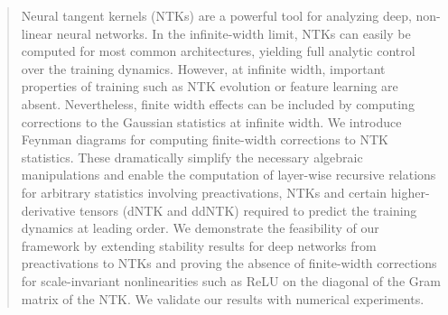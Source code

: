 \begin{abstract}
  Neural tangent kernels (NTKs) are a powerful tool for analyzing deep, non-linear neural networks. In the infinite-width limit, NTKs can easily be computed for most common architectures, yielding full analytic control over the training dynamics. However, at infinite width, important properties of training such as NTK evolution or feature learning are absent. Nevertheless, finite width effects can be included by computing corrections to the Gaussian statistics at infinite width. We introduce Feynman diagrams for computing finite-width corrections to NTK statistics. These dramatically simplify the necessary algebraic manipulations and enable the computation of layer-wise recursive relations for arbitrary statistics involving preactivations, NTKs and certain higher-derivative tensors (dNTK and ddNTK) required to predict the training dynamics at leading order. We demonstrate the feasibility of our framework by extending stability results for deep networks from preactivations to NTKs and proving the absence of finite-width corrections for scale-invariant nonlinearities such as ReLU on the diagonal of the Gram matrix of the NTK. We validate our results with numerical experiments.
\end{abstract}

